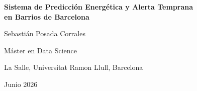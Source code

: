 \documentclass[12pt, a4paper]{article}
\begin{document}
\begin{titlepage}
    \centering
    \vspace*{2cm}
    {\LARGE\bfseries Sistema de Predicción Energética y Alerta Temprana\\[0.3em]
    en Barrios de Barcelona\par}
    \vspace{2cm}
    {\large Sebastián Posada Corrales\par}
    \vspace{0.5cm}
    {\normalsize Máster en Data Science\par}
    {\normalsize La Salle, Universitat Ramon Llull, Barcelona\par}
    {\normalsize Junio 2026\par}
    \vfill
\end{titlepage}
\end{document}
